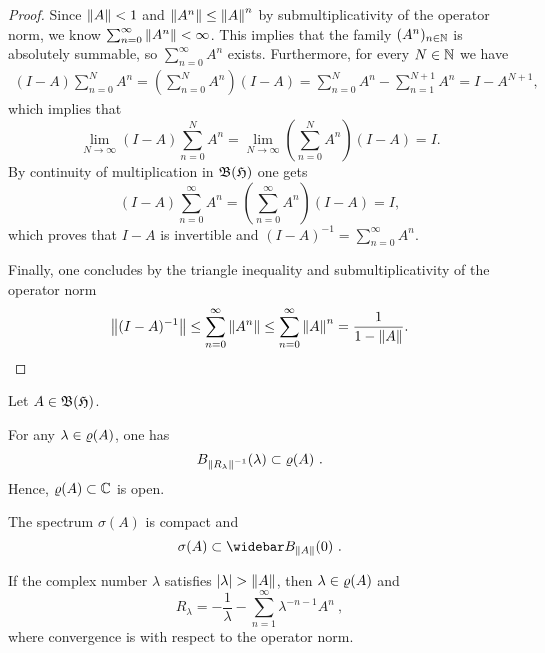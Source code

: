 \begin{proof}
  Since $\left\|A\right\| < 1$ and $\left\|A^n\right\| \leq \left\|A\right\|^n$ by submultiplicativity of the operator norm, we know
  $\sum_{n=0}^\infty \left\|A^n\right\| < \infty$. This implies that the  family $(A^n)_{n\in\mathbb{N}}$ is absolutely summable,
  so $\sum_{n=0}^\infty A^n$ exists. Furthermore, for every $N \in \mathbb{N}$ we have
  \begin{align*}
    (I-A)\sum_{n=0}^N A^n = \left(\sum_{n=0}^N A^n \right)(I-A)= \sum_{n=0}^N A^n - \sum_{n=1}^{N+1}A^n = I - A^{N+1},
  \end{align*}
which implies that 
\[
\lim_{N \rightarrow \infty}(I-A)\sum_{n=0}^N A^n = \lim_{N \rightarrow \infty} \left(\sum_{n=0}^N A^n\right) (I-A) = I.
\]
By continuity of multiplication in $\mathfrak{B}(\mathfrak{H})$ one gets
\[
(I-A) \sum_{n=0}^\infty A^n = \left(\sum_{n=0}^\infty A^n\right) (I-A) = I,
\]
which proves that $I-A$ is invertible and $(I-A)^{-1} = \sum_{n=0}^\infty A^n$.

Finally,  one concludes by the triangle inequality and submultiplicativity of the operator norm 
\[
  \left\|(I - A)^{-1}\right\| \leq \sum_{n=0}^\infty \left\|A^n\right\| \leq \sum_{n=0}^\infty \left\|A\right\|^n = \frac{1}{1 - \left\|A\right\|}. 
\]
\end{proof}

\begin{proposition}\label{thm:resolvent-topological-properties}
Let $A \in \mathfrak{B}(\mathfrak{H})$. 
\begin{romanlist}
\item For any $\lambda \in \varrho(A)$, one has
	\[
	B_{\left\|R_{\lambda}\right\|^{-1}}(\lambda) \subset \varrho(A) \ .
	\]
	Hence, $\varrho(A) \subset \mathbb{C}$ is open.
\item The spectrum $\sigma(A)$ is compact and
	\[
	\sigma(A) \subset \closure{B}_{\norm{A}}(0) \ .
	\]
\item\label{ite:resolvent-expansion-large-argument} If the complex number $\lambda$ satisfies ${\left|\lambda\right|} > \left\|A\right\|$, then $\lambda \in \varrho(A)$ and
      \[
	R_\lambda = - \frac{1}{\lambda} - \sum_{n=1}^\infty \lambda^{-n-1}A^n \ ,
      \]
      where convergence is with respect to the operator norm.  
\end{romanlist}
\end{proposition}

